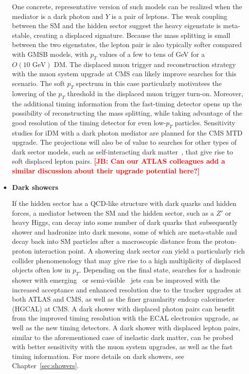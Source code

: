 \begin{itemize}
One concrete, representative version of such models can be realized when the mediator is a dark photon and $Y$ is a pair of leptons. The weak coupling between the SM and the hidden sector suggest the heavy eigenstate is meta-stable, creating a displaced signature. Because the mass splitting is small between the two eigenstates, the lepton pair is also typically softer compared with GMSB models, with $p_T$ values of a few to tens of GeV for a $O(10\,\,\mathrm{GeV})$ DM. The displaced muon trigger and reconstruction strategy with the muon system upgrade at CMS can likely improve searches for this scenario. The soft $p_T$ spectrum in this case particularly motivatees the lowering of the $p_T$ threshold in the displaced muon trigger turn-on. Moreover, the additional timing information from the fast-timing detector opens up the possibility of reconstructing the mass splitting, while taking advantage of the good resolution of the timing detector for even low-$p_T$ particles. Sensitivity studies for iDM with a dark photon mediator are planned for the CMS MTD upgrade. The projections will also be of value to searches for other types of dark sector models, such as self-interacting dark matter~\cite{Hochberg:2014dra}, that give rise to soft displaced lepton pairs. {\bf \textcolor{red}{[JB: Can our ATLAS colleagues add a similar discussion about their upgrade potential here?]}}

\item \textbf{Dark showers}

If the hidden sector has a QCD-like structure with dark quarks and hidden forces, a mediator between the SM and the hidden sector, such as a $Z'$ or heavy Higgs, can decay into some number of dark quarks that subsequently shower and hadronize into dark mesons, some of which are meta-stable and decay back into SM particles after a macroscopic distance from the proton-proton interaction point. A showering dark sector can yield a particularly rich collider phenomenology that may give rise to a high multiplicity of displaced objects often low in $p_T$. Depending on the final state, searches for a hadronic shower with emerging~\cite{Schwaller:2015gea} or semi-visible~\cite{Cohen:2015toa} jets can be improved with the increased acceptance and enhanced resolution due to the tracker upgrades at both ATLAS and CMS, as well as the finer granularity endcap calorimeter (HGCAL) at CMS. A dark shower with displaced photon pairs can benefit from the improved timing resolution with the ECAL electronics upgrade, as well as the new timing detectors. A dark shower with displaced lepton pairs, similar to the aforementioned case of inelastic dark matter, can be probed with better sensitivity with the muon system upgrades, as well as the fast timing information. For more details on dark showers, see Chapter~\ref{sec:showers}.


\end{itemize}
